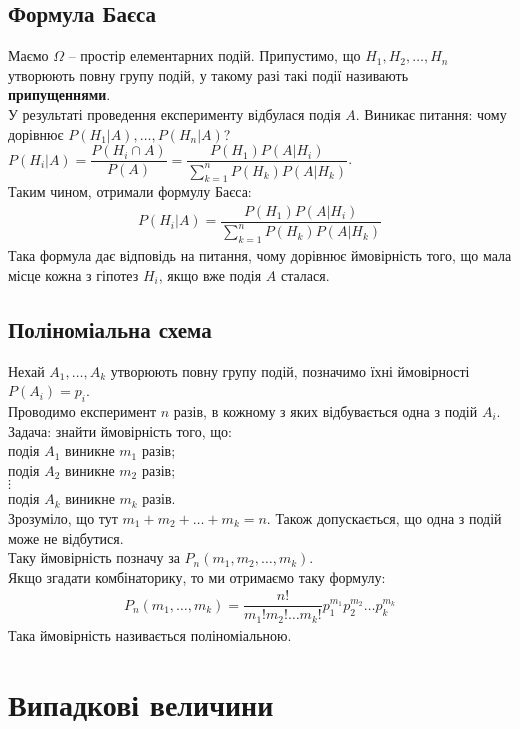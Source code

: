 \documentclass[a4paper, 10pt]{article}
\theoremstyle{theoremdd}
\begin{document}
\subsection{Формула Баєса}
Маємо $\Omega$ -- простір елементарних подій. Припустимо, що $H_1,H_2,\dots,H_n$ утворюють повну групу подій, у такому разі такі події називають \textbf{припущеннями}.\\
У результаті проведення експерименту відбулася подія $A$. Виникає питання: чому дорівнює $P(H_1|A),\dots,P(H_n|A)$?\\
$P(H_i|A) = \dfrac{P(H_i \cap A)}{P(A)} = \dfrac{P(H_1) P(A|H_i)}{\sum_{k=1}^n P(H_k) P(A|H_k)}$.\\
Таким чином, отримали формулу Баєса:
\begin{align*}
P(H_i|A) = \dfrac{P(H_1) P(A|H_i)}{\displaystyle\sum_{k=1}^n P(H_k)P(A|H_k)}
\end{align*}
Така формула дає відповідь на питання, чому дорівнює ймовірність того, що мала місце кожна з гіпотез $H_i$, якщо вже подія $A$ сталася.

\subsection{Поліноміальна схема}
Нехай $A_1,\dots,A_k$ утворюють повну групу подій, позначимо їхні ймовірності $P(A_i) = p_i$.\\
Проводимо експеримент $n$ разів, в кожному з яких відбувається одна з подій $A_i$. Задача: знайти ймовірність того, що:\\
подія $A_1$ виникне $m_1$ разів;\\
подія $A_2$ виникне $m_2$ разів;\\
$\vdots$\\
подія $A_k$ виникне $m_k$ разів.\\
Зрозуміло, що тут $m_1 + m_2 + \dots + m_k = n$. Також допускається, що одна з подій може не відбутися.\\
Таку ймовірність позначу за $P_n(m_1,m_2,\dots,m_k)$.\\
Якщо згадати комбінаторику, то ми отримаємо таку формулу:
\begin{align*}
P_n(m_1,\dots,m_k) = \dfrac{n!}{m_1! m_2! \dots m_k!} p_1^{m_1} p_2^{m_2} \dots p_k^{m_k}
\end{align*}
Така ймовірність називається поліноміальною.
\newpage

\section{Випадкові величини}
\end{document}
